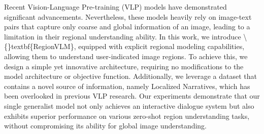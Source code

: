 Recent Vision-Language Pre-training (VLP) models have demonstrated significant advancements. Nevertheless, these models heavily rely on image-text pairs that capture only coarse and global information of an image, leading to a limitation in their regional understanding ability. In this work, we introduce \textbackslash\{\}textbf\{RegionVLM\}, equipped with explicit regional modeling capabilities, allowing them to understand user-indicated image regions. To achieve this, we design a simple yet innovative architecture, requiring no modifications to the model architecture or objective function. Additionally, we leverage a dataset that contains a novel source of information, namely Localized Narratives, which has been overlooked in previous VLP research. Our experiments demonstrate that our single generalist model not only achieves an interactive dialogue system but also exhibits superior performance on various zero-shot region understanding tasks, without compromising its ability for global image understanding.